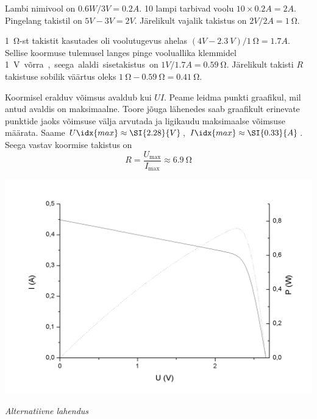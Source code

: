 \documentclass[10pt, twoside]{article}
\begin{document}
{%

\solu
\osa Lambi nimivool on $\SI{0,6}W/\SI{3}V=\SI{0,2}A$. 10
lampi tarbivad voolu $10\times \SI{0,2}A=\SI{2}A$. Pingelang takistil on $\SI{5}V-\SI{3}V=\SI{2}V$. Järelikult vajalik takistus on $\SI{2}V/\SI{2}A=\SI{1}{\ohm}$.

\osa \SI{1}{\ohm}-st takistit kasutades oli voolutugevus ahelas $(\SI{4}V-\SI{2,3}{V})/\SI{1}{\ohm}=\SI{1,7}A$. Sellise koormuse tulemusel langes pinge vooluallika
klemmidel \SI{1}V võrra, seega alaldi sisetakistus on $\SI{1}V/\SI{1,7}A=\SI{0,59}{\ohm}$. Järelikult takisti $R$ takistuse sobilik väärtus oleks
$\SI{1}{\ohm}-\SI{0,59}{\ohm}=\SI{0,41}{\ohm}$.
\probend
\bigskip


\solu
Koormisel eralduv võimsus avaldub kui $UI$. Peame leidma punkti graafikul, mil antud avaldis on maksimaalne. Toore jõuga lähenedes saab graafikult erinevate punktide jaoks võimsuse välja arvutada ja ligikaudu maksimaalse võimsuse määrata. Saame $U\idx{max} \approx \SI{2.28}{V}$, $I\idx{max}\approx \SI{0.33}{A}$. Seega vastav koormise takistus on
\[
R = \frac{U_\mathrm{max}}{I_\mathrm{max}} \approx \SI{6.9}{\ohm}
\]


\begin{center}
	\vspace{-0.1cm}
	\includegraphics[width=0.8\linewidth]{2010-v3g-03-paneel_lah.png}
\end{center}

\textit{Alternatiivne lahendus}\\

}
\end{document}
